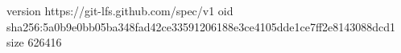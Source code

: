 version https://git-lfs.github.com/spec/v1
oid sha256:5a0b9e0bb05ba348fad42ce33591206188e3ce4105dde1ce7ff2e8143088dcd1
size 626416
